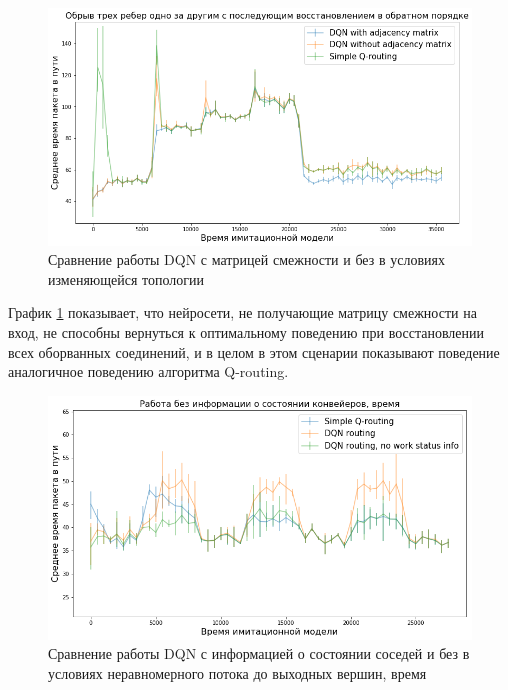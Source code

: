 \documentclass[specification, annotation]{itmo-student-thesis}
\begin{document}
\begin{figure}[!h]
  \caption{Сравнение работы DQN с матрицей смежности и без в условиях
    изменяющейся топологии}\label{experiment-with-without-amatrix}
  \centering
  \includegraphics[scale=0.6]{experiment-with-without-amatrix}
\end{figure}

График \ref{experiment-with-without-amatrix} показывает, что нейросети, не
получающие матрицу смежности на вход, не способны вернуться к оптимальному
поведению при восстановлении всех оборванных соединений, и в целом в этом
сценарии показывают поведение аналогичное поведению алгоритма Q-routing.

\begin{figure}[!h]
  \caption{Сравнение работы DQN с информацией о состоянии соседей и без в
    условиях неравномерного потока до выходных вершин, время}\label{experiment-conveyors-en1-time-no-ws}
  \centering
  \includegraphics[scale=0.6]{experiment-conveyors-en1-time-no-ws}
\end{figure}
\end{document}
